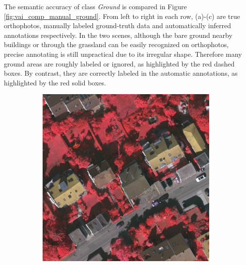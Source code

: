 The semantic accuracy of class \textit{Ground} is compared in Figure \ref{fig:vai_comp_manual_ground}. From left to right in each row, (a)-(c) are true orthophotos, manually labeled ground-truth data and automatically inferred annotations respectively. In the two scenes, although the bare ground nearby buildings or through the grassland can be easily recognized on orthophotos, precise annotating is still unpractical due to its irregular shape. Therefore many ground areas are roughly labeled or ignored, as highlighted by the red dashed boxes. By contrast, they are correctly labeled in the automatic annotations, as highlighted by the red solid boxes.  
\begin{figure}[H]
\begin{subfigure}{0.315\columnwidth}
  \centering
  \includegraphics[width=1\linewidth]{fig/comp_manual/15_rgb1_crop.jpg}  
\end{subfigure}\vspace{1mm}
~
\begin{subfigure}{0.315\columnwidth}
  \centering
   \begin{tikzpicture}

\end{tikzpicture}
\end{subfigure}
\end{figure}
